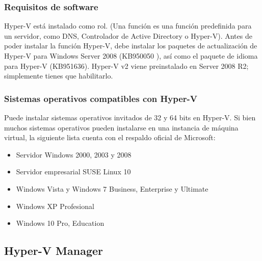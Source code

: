 \documentclass[journal]{IEEEtran}
\begin{document}
\subsubsection{Requisitos de software}
Hyper-V está instalado como rol. (Una función es una función predefinida para un servidor, como DNS, Controlador de Active Directory o Hyper-V). Antes de poder instalar la función Hyper-V, debe instalar los paquetes de actualización de Hyper-V para Windows Server 2008 (KB950050 ), así como el paquete de idioma para Hyper-V (KB951636). Hyper-V v2 viene preinstalado en Server 2008 R2; simplemente tienes que habilitarlo. \cite{OLZAK201029}
\subsubsection{Sistemas operativos compatibles con Hyper-V}
Puede instalar sistemas operativos invitados de 32 y 64 bits en Hyper-V. Si bien muchos sistemas operativos pueden instalarse en una instancia de máquina virtual, la siguiente lista cuenta con el respaldo oficial de Microsoft: 
\begin{itemize}
\item Servidor Windows 2000, 2003 y 2008 
\item Servidor empresarial SUSE Linux 10 
\item Windows Vista y Windows 7 Business, Enterprise y Ultimate 
\item Windows XP Profesional
\item Windows 10 Pro, Education
\end{itemize}

\subsection{Hyper-V Manager}
\end{document}
